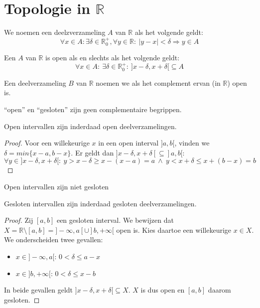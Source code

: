 \documentclass[main.tex]{subfiles}
\begin{document}
\chapter{Topologie in $\mathbb{R}$}
\label{cha:topologie-mathbbr}

\begin{de}
  We noemen een deelzverzameling $A$ van $\mathbb{R}$  als het volgende geldt:
  \[ \forall x\in A: \exists \delta \in \mathbb{R}_{0}^{+}, \forall y\in \mathbb{R}:\ |y-x| < \delta \Rightarrow y\in A \]
\end{de}

\begin{st}
  Een $A$ van $\mathbb{R}$ is open als en slechts als het volgende geldt:
  \[ \forall x\in A:\ \exists \delta \in \mathbb{R}_{0}^{+}:\ ]x-\delta,x+\delta[ \subseteq A \]

\end{st}

\begin{de}
  Een deelverzameling $B$ van $\mathbb{R}$ noemen we  als het complement ervan (in $\mathbb{R}$) open is.
\end{de}

\begin{opm}
  ``open'' en ``gesloten'' zijn geen complementaire begrippen.
\end{opm}

\begin{st}
  Open intervallen zijn inderdaad open deelverzamelingen.

  \begin{proof}
    Voor een willekeurige $x$ in een open interval $]a,b[$, vinden we $\delta = min\{x-a,b-x\}$.
    Er geldt dan $]x-\delta,x+\delta[ \subseteq ]a,b[$:
    \[ \forall y\in ]x-\delta,x+\delta[:\ y > x-\delta \ge x-(x-a) = a \ \wedge\ y < x+\delta \le x+(b-x) = b \]
  \end{proof}
\end{st}

\begin{st}
  Open intervallen zijn niet gesloten
\end{st}

\begin{st}
  Gesloten intervallen zijn inderdaad gesloten deelverzamelingen.

  \begin{proof}
    Zij $[a,b]$ een gesloten interval.
    We bewijzen dat $X = \mathbb{R} \setminus [a,b] = ]-\infty,a[ \cup]b,+\infty[$ open is.
    Kies daartoe een willekeurige $x\in X$.
    We onderscheiden twee gevallen:
    \begin{itemize}
    \item $x \in ]-\infty,a[$: $0 < \delta \le a-x$
    \item $x \in  ]b,+\infty[$: $0 < \delta \le x-b$
    \end{itemize}
    In beide gevallen geldt $]x-\delta, x+\delta[ \subseteq X$. $X$ is dus open en $[a,b]$ daarom gesloten.
  \end{proof}
\end{st}
\end{document}

